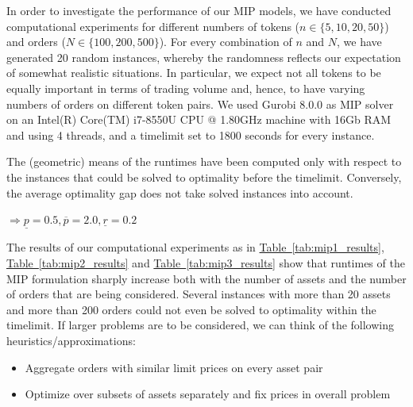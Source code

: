 \documentclass[11pt,parskip=full]{scrartcl}%
\newcommand*{\wrt}{with respect to }
\newcommand*{\tabref}[1]{\hyperref[{#1}]{Table~\ref*{#1}}}
\begin{document}
In order to investigate the performance of our MIP models, we have conducted computational
experiments for different numbers of tokens ($ n \in \{5,10,20,50\} $) and orders ($ N \in 
\{100,200,500\} $).
For every combination of $ n $ and $ N $, we have generated 20 random instances, whereby the
randomness reflects our expectation of somewhat realistic situations.
In particular, we expect not all tokens to be equally important in terms of trading volume and,
hence, to have varying numbers of orders on different token pairs.
We used Gurobi 8.0.0 as MIP solver on an Intel(R) Core(TM) i7-8550U CPU @ 1.80GHz machine with 16Gb
RAM and using 4 threads, and a timelimit set to 1800 seconds for every instance.

The (geometric) means of the runtimes have been computed only \wrt the instances that could be
solved to optimality before the timelimit. Conversely, the average optimality gap does not take
solved instances into account.

$ \Rightarrow \underline{p}=0.5, \overline{p}=2.0, \underline{r}=0.2 $

\vspace{-5mm}
The results of our computational experiments as in \tabref{tab:mip1_results},
\tabref{tab:mip2_results} and \tabref{tab:mip3_results} show that runtimes of the MIP formulation
sharply increase both with the number of assets and the number of orders that are being considered.
Several instances with more than 20 assets and more than 200 orders could not even be solved to
optimality within the timelimit.
If larger problems are to be considered, we can think of the following heuristics/approximations:
\begin{itemize}
    \item Aggregate orders with similar limit prices on every asset pair
    \item Optimize over subsets of assets separately and fix prices in overall problem
\end{itemize}
\end{document}
